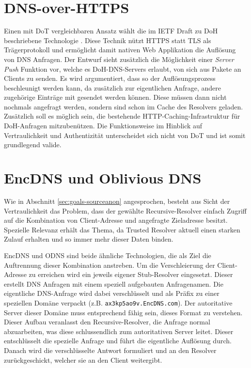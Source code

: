 \section{DNS-over-HTTPS}
Einen mit DoT vergleichbaren Ansatz wählt die im IETF Draft zu \ac{DoH} beschriebene Technologie \cite{Mcmanus2018}. Diese Technik nützt HTTPS statt TLS als Trägerprotokoll und ermöglicht damit nativen Web Applikation die Auflösung von DNS Anfragen. Der Entwurf sieht zusätzlich die Möglichkeit einer \textit{Server Push} Funktion vor, welche es \ac{DoH}-DNS-Servers erlaubt, von sich aus Pakete an Clients zu senden. Es wird argumentiert, dass so der Auflösungsprozess beschleunigt werden kann, da zusätzlich zur eigentlichen Anfrage, andere zugehörige Einträge mit gesendet werden können. Diese müssen dann nicht nochmals angefragt werden, sondern sind schon im Cache des Resolvers geladen. Zusätzlich soll es möglich sein, die bestehende HTTP-Caching-Infrastruktur für DoH-Anfragen mitzubenützen. Die Funktionsweise im Hinblick auf Vertraulichkeit und Authentizität unterscheidet sich nicht von DoT und ist somit grundlegend valide. 

\section{EncDNS und Oblivious DNS}
\label{tec:encdns-odns}
Wie in Abschnitt \ref{sec:goals-sourceanon} angesprochen, besteht aus Sicht der Vertraulichkeit das Problem, dass der gewählte Recursive-Resolver einfach Zugriff auf die Kombination von Client-Adresse und angefragte Zieladresse besitzt. Spezielle Relevanz erhält das Thema, da Trusted Resolver aktuell einen starken Zulauf erhalten und so immer mehr dieser Daten binden.

EncDNS \cite{Herrmann2014} und \ac{ODNS}\cite{Schmitt2018} sind beide ähnliche Technologien, die als Ziel die Auftrennung dieser Kombination anstreben. Um die Verschleierung der Client-Adresse zu erreichen wird ein jeweils eigener Stub-Resolver eingesetzt. Dieser erstellt DNS Anfragen mit einem speziell aufgebauten Anfragenamen. Die eigentliche DNS-Anfrage wird dabei verschlüsselt und als Präfix zu einer speziellen Domäne verpackt (z.B. \texttt{ax3kp5ao9v.EncDNS.com}). Der autoritative Server dieser Domäne muss entsprechend fähig sein, dieses Format zu verstehen. Dieser Aufbau veranlasst den Recursive-Resolver, die Anfrage normal abzuarbeiten, was diese schlussendlich zum autoritativen Server leitet. Dieser entschlüsselt die spezielle Anfrage und führt die eigentliche Auflösung durch. Danach wird die verschlüsselte Antwort formuliert und an den Resolver zurückgeschickt, welcher sie an den Client weitergibt.

